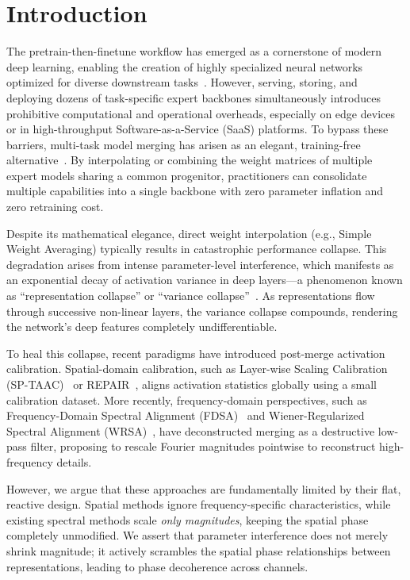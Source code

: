 \documentclass{article}
\theoremstyle{plain}
\theoremstyle{definition}
\theoremstyle{remark}
\begin{document}
\section{Introduction}
\label{submission-intro}
The pretrain-then-finetune workflow has emerged as a cornerstone of modern deep learning, enabling the creation of highly specialized neural networks optimized for diverse downstream tasks~\cite{devlin2018bert, brown2020language}. However, serving, storing, and deploying dozens of task-specific expert backbones simultaneously introduces prohibitive computational and operational overheads, especially on edge devices or in high-throughput Software-as-a-Service (SaaS) platforms. To bypass these barriers, multi-task model merging has arisen as an elegant, training-free alternative~\cite{wortsman2022model, ilharco2023editing}. By interpolating or combining the weight matrices of multiple expert models sharing a common progenitor, practitioners can consolidate multiple capabilities into a single backbone with zero parameter inflation and zero retraining cost.

Despite its mathematical elegance, direct weight interpolation (e.g., Simple Weight Averaging) typically results in catastrophic performance collapse. This degradation arises from intense parameter-level interference, which manifests as an exponential decay of activation variance in deep layers—a phenomenon known as ``representation collapse'' or ``variance collapse''~\cite{jordan2022repair, yang2026ModelMergingSurvey}. As representations flow through successive non-linear layers, the variance collapse compounds, rendering the network's deep features completely undifferentiable.

To heal this collapse, recent paradigms have introduced post-merge activation calibration. Spatial-domain calibration, such as Layer-wise Scaling Calibration (SP-TAAC)~\cite{anonymous2026sptaac} or REPAIR~\cite{jordan2022repair}, aligns activation statistics globally using a small calibration dataset. More recently, frequency-domain perspectives, such as Frequency-Domain Spectral Alignment (FDSA)~\cite{visionary2026fdsa} and Wiener-Regularized Spectral Alignment (WRSA)~\cite{theorist2026wrsa}, have deconstructed merging as a destructive low-pass filter, proposing to rescale Fourier magnitudes pointwise to reconstruct high-frequency details.

However, we argue that these approaches are fundamentally limited by their flat, reactive design. Spatial methods ignore frequency-specific characteristics, while existing spectral methods scale \textit{only magnitudes}, keeping the spatial phase completely unmodified. We assert that parameter interference does not merely shrink magnitude; it actively scrambles the spatial phase relationships between representations, leading to phase decoherence across channels. 
\end{document}
